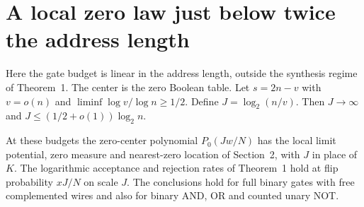 \section{A local zero law just below twice the address length}
Here the gate budget is linear in the address length, outside the synthesis regime of Theorem~1. The center is the zero Boolean table. Let $s=2n-v$ with $v=o(n)$ and $\liminf\log v/\log n\ge1/2$. Define $J=\log_2(n/v)$. Then $J\to\infty$ and $J\le(1/2+o(1))\log_2 n$.

\begin{theorem}\label{th:linear}
At these budgets the zero-center polynomial $P_0(Jw/N)$ has the local limit potential, zero measure and nearest-zero location of Section~2, with $J$ in place of $K$. The logarithmic acceptance and rejection rates of Theorem~1 hold at flip probability $xJ/N$ on scale $J$. The conclusions hold for full binary gates with free complemented wires and also for binary AND, OR and counted unary NOT.
\end{theorem}
